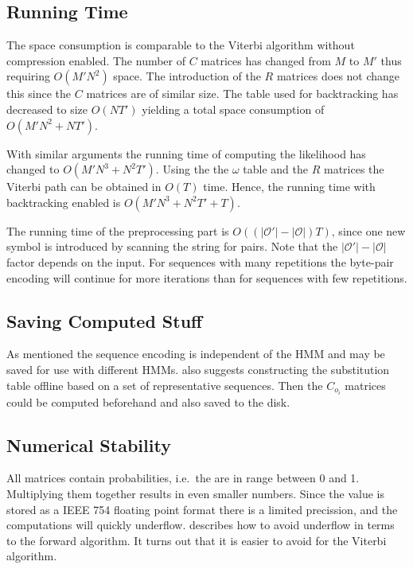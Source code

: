 \subsection{Running Time}
\label{sec:running-time}

The space consumption is comparable to the Viterbi algorithm without
compression enabled. The number of $C$ matrices has changed from $M$ to $M'$
thus requiring $O(M' N^2)$ space. The introduction of the $R$ matrices does not
change this since the $C$ matrices are of similar size. The table used for
backtracking has decreased to size $O(N T')$ yielding a total space consumption
of $O(M' N^2 + N T')$.

With similar arguments the running time of computing the likelihood has changed
to $O(M' N^3 +N^2 T')$. Using the the $\omega$ table and the $R$ matrices the
Viterbi path can be obtained in $O(T)$ time. Hence, the running time with
backtracking enabled is $O(M' N^3 +N^2 T' + T)$.

The running time of the preprocessing part is $O(
\left(
  \lvert\mathcal{O'}\rvert - \lvert{\mathcal{O}}\rvert
\right) T)$, since one new symbol is introduced by scanning the string for
pairs. Note that the $\lvert\mathcal{O'}\rvert - \lvert{\mathcal{O}}\rvert$
factor depends on the input. For sequences with many repetitions the byte-pair
encoding will continue for more iterations than for sequences with few
repetitions.

\subsection{Saving Computed Stuff}
\label{sec:saving-comp-stuff}

As mentioned the sequence encoding is independent of the HMM and may be saved
for use with different HMMs. \citet{lifshits2009speeding} also suggests
constructing the substitution table offline based on a set of representative
sequences. Then the $C_{o_i}$ matrices could be computed beforehand and also
saved to the disk.

\subsection{Numerical Stability}
\label{sec:numerical-stability}

All matrices contain probabilities, i.e.\ the are in range between 0 and
1. Multiplying them together results in even smaller numbers. Since the value
is stored as a IEEE 754 floating point format there is a limited precission,
and the computations will quickly underflow. \citet{sand2013ziphmmlib}
describes how to avoid underflow in terms to the forward algorithm. It turns
out that it is easier to avoid for the Viterbi algorithm.

